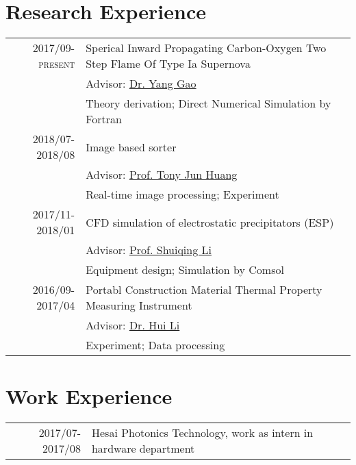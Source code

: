 \documentclass[a4paper,10pt]{article}
\begin{document}
\section{Research Experience}
\begin{tabular}{rl}
\textsc{2017/09-present} & Sperical Inward Propagating Carbon-Oxygen Two Step Flame Of Type Ia Supernova \\
                         & \small Advisor: \href{http://www.tsinghua.edu.cn/publish/teen/2472/2016/20160429193334896914447/20160429193334896914447_.html}{Dr. Yang Gao} \\
                         & Theory derivation; Direct Numerical Simulation by Fortran \\
\textsc{2018/07-2018/08} & Image based sorter\\
                         & \small Advisor: \href{https://acoustofluidics.pratt.duke.edu/people/tony-jun-huang}{Prof. Tony Jun Huang} \\
                         & Real-time image processing; Experiment \\
\textsc{2017/11-2018/01} & CFD simulation of electrostatic precipitators (ESP)\\
                         & \small Advisor: \href{http://www.tsinghua.edu.cn/publish/teen/2472/2010/20101222191303970621540/20101222191303970621540_.html}{Prof. Shuiqing Li} \\
                         & Equipment design; Simulation by Comsol \\
\textsc{2016/09-2017/04} & Portabl Construction Material Thermal Property Measuring Instrument \\
                         & \small Advisor: \href{http://www.tsinghua.edu.cn/publish/te/2230/2017/20170816112830349410941/20170816112830349410941_.html}{Dr. Hui Li} \\
                         & Experiment; Data processing \\
\end{tabular}

\section{Work Experience}
\begin{tabular}{rl}
\textsc{2017/07-2017/08} &  Hesai Photonics Technology, work as intern in hardware department \\
\end{tabular}

\end{document}
